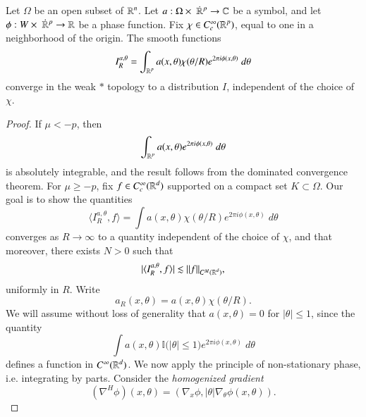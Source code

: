\begin{theorem}
    Let $\Omega$ be an open subset of $\operatorname{\mathbb{R}}^n$. Let $a: {\Omega} \times\; {\dot{\RR}{\vphantom{\RR}}^p} \to \CC$ be a symbol, and let $\phi: W\times\; \dot{\RR}{\vphantom{\RR}}^p \to \RR$ be a phase function. Fix $\chi \in C_c^\infty(\operatorname{\mathbb{R}}^p)$, equal to one in a neighborhood of the origin. The smooth functions
    \[ I^{a,\theta}_R = \int_{\operatorname{\mathbb{R}}^p} a(x,\theta) \chi(\theta / R) e^{2 \pi i \phi(x,\theta)}\; d\theta \]
    converge in the weak $*$ topology to a distribution $I$, independent of the choice of $\chi$. 
\end{theorem}
\begin{proof}
    If $\mu < -p$, then
    \begin{equation}
        \int_{\operatorname{\mathbb{R}}^p} a(x,\theta) e^{2 \pi i \phi(x,\theta)}\; d\theta
    \end{equation}
    is absolutely integrable, and the result follows from the dominated convergence theorem. For $\mu \geq -p$, fix $f \in C_c^\infty(\operatorname{\mathbb{R}}^d)$ supported on a compact set $K \subset \Omega$. Our goal is to show the quantities
    \begin{equation}
        \langle I^{a,\theta}_R, f \rangle = \int a(x,\theta) \chi(\theta / R) e^{2 \pi i \phi(x,\theta)}\; d\theta
    \end{equation}
    converges as $R \to \infty$ to a quantity independent of the choice of $\chi$, and that moreover, there exists $N > 0$ such that
    \begin{equation}
        |\langle I^{a,\theta}_R, f \rangle| \lesssim \| f \|_{C^M(\operatorname{\mathbb{R}}^d)},
    \end{equation}
    uniformly in $R$. Write
    \begin{equation}
        a_R(x,\theta) = a(x, \theta) \chi(\theta / R).
    \end{equation}
    We will assume without loss of generality that $a(x,\theta) = 0$ for $|\theta| \leq 1$, since the quantity
    \begin{equation}
        \int a(x,\theta) \mathbb{I} \big(|\theta| \leq 1 \big) e^{2 \pi i \phi(x,\theta)}\; d\theta
    \end{equation}
    defines a function in $C^\infty(\operatorname{\mathbb{R}}^d)$. We now apply the principle of non-stationary phase, i.e. integrating by parts. Consider the \emph{homogenized gradient}
    \begin{equation}
        (\nabla^H\! \phi)(x,\theta) = ( \nabla_x \phi, |\theta| \nabla_\theta \phi(x,\theta) ).

\end{equation}
\end{proof}
